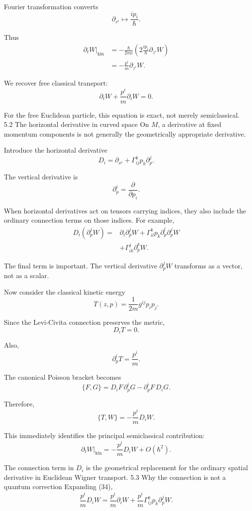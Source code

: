 Fourier transformation converts
\[
\partial_{v^i}\longmapsto \frac{ip_i}{\hbar}.
\]

Thus
\[
\begin{aligned}
\left.\partial_tW\right|_{\mathrm{kin}}
&=-\frac{\hbar}{2mi}
\left(2\frac{ip_i}{\hbar}\partial_{z^i}W\right)\\
&=-\frac{p^i}{m}\partial_{z^i}W.
\end{aligned}
\tag{24}
\]

We recover free classical transport:
\[
\partial_tW+\frac{p^i}{m}\partial_iW=0.
\tag{25}
\]

For the free Euclidean particle, this equation is exact, not merely semiclassical.
5.2 The horizontal derivative in curved space
On \(M\), a derivative at fixed momentum components is not generally the geometrically appropriate derivative.

Introduce the horizontal derivative
\[
\boxed{
D_i=
\partial_{x^i}+
\Gamma^k_{ij}p_k\partial_p^j.
}
\tag{26}
\]

The vertical derivative is
\[
\partial_p^i=\frac{\partial}{\partial p_i}.
\tag{27}
\]

When horizontal derivatives act on tensors carrying indices, they also include the ordinary connection terms on those indices. For example,
\[
\begin{aligned}
D_i(\partial_p^j W)
={}&\partial_i\partial_p^jW
+\Gamma^k_{il}p_k
\partial_p^l\partial_p^jW\\
&+\Gamma^j_{ik}\partial_p^kW.
\end{aligned}
\tag{28}
\]

The final term is important. The vertical derivative \(\partial_p^jW\) transforms as a vector, not as a scalar.

Now consider the classical kinetic energy
\[
T(z,p)=\frac1{2m}g^{ij}p_ip_j.
\tag{29}
\]

Since the Levi-Civita connection preserves the metric,
\[
\boxed{
D_iT=0.
}
\tag{30}
\]

Also,
\[
\partial_p^iT=\frac{p^i}{m}.
\tag{31}
\]

The canonical Poisson bracket becomes
\[
\{F,G\}
=
D_iF\,\partial_p^iG
-
\partial_p^iF\,D_iG.
\tag{32}
\]

Therefore,
\[
\{T,W\}=-\frac{p^i}{m}D_iW.
\tag{33}
\]

This immediately identifies the principal semiclassical contribution:
\[
\boxed{
\left.\partial_tW\right|_{\mathrm{kin}}
=
-\frac{p^i}{m}D_iW+O(\hbar^2).
}
\tag{34}
\]

The connection term in \(D_i\) is the geometrical replacement for the ordinary spatial derivative in Euclidean Wigner transport.
5.3 Why the connection is not a quantum correction
Expanding (34),
\[
\frac{p^i}{m}D_iW
=
\frac{p^i}{m}\partial_iW+
\frac{p^i}{m}\Gamma^k_{ij}p_k\partial_p^jW.
\tag{35}
\]

